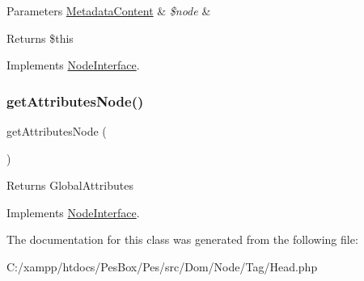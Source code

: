 \begin{DoxyParams}[1]{Parameters}
\mbox{\hyperlink{class_pes_1_1_dom_1_1_node_1_1_tag_1_1_metadata_content}{Metadata\+Content}} & {\em \$node} & \\
\hline
\end{DoxyParams}
\begin{DoxyReturn}{Returns}
\$this 
\end{DoxyReturn}


Implements \mbox{\hyperlink{interface_pes_1_1_dom_1_1_node_1_1_node_interface_a1d59c3782ba90a94f31ee6c58d86e9fc}{Node\+Interface}}.

\mbox{\label{class_pes_1_1_dom_1_1_node_1_1_tag_1_1_head_a4722e7722b245351681b05d35f6694f3}} 
\subsubsection{\texorpdfstring{get\+Attributes\+Node()}{getAttributesNode()}}
{\footnotesize\ttfamily get\+Attributes\+Node (\begin{DoxyParamCaption}{ }\end{DoxyParamCaption})}

\begin{DoxyReturn}{Returns}
Global\+Attributes 
\end{DoxyReturn}


Implements \mbox{\hyperlink{interface_pes_1_1_dom_1_1_node_1_1_node_interface_a4722e7722b245351681b05d35f6694f3}{Node\+Interface}}.



The documentation for this class was generated from the following file\+:\begin{DoxyCompactItemize}
\item 
C\+:/xampp/htdocs/\+Pes\+Box/\+Pes/src/\+Dom/\+Node/\+Tag/Head.\+php\end{DoxyCompactItemize}
